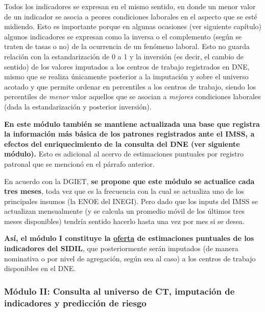 \documentclass[
]{article}
\begin{document}
\begin{rmdcomment}
Todos los indicadores se expresan en el mismo sentido, en donde un menor
valor de un indicador se asocia a peores condiciones laborales en el
aspecto que se esté midiendo. Esto es importante porque en algunas
ocasiones (ver siguiente capítulo) algunos indicadores se expresan como
la inversa o el complemento (según se traten de tasas o no) de la
ocurrencia de un fenómeno laboral. Esto no guarda relación con la
estandarización de 0 a 1 y la inversión (es decir, el cambio de sentido)
de los valores imputados a los centros de trabajo registrados en DNE,
mismo que se realiza únicamente posterior a la imputación y sobre el
universo acotado y que permite ordenar en percentiles a los centros de
trabajo, siendo los percentiles de \emph{menor} valor aquellos que se
asocian a \emph{mejores} condiciones laborales (dada la estandarización
y posterior inversión).
\end{rmdcomment}

\textbf{En este módulo también se mantiene actualizada una base que registra la información más básica de los patrones registrados ante el IMSS, a efectos del enriquecimiento de la consulta del DNE (ver siguiente módulo).} Esto es adicional al acervo de estimaciones puntuales por registro patronal que se mencionó en el párrafo anterior.

En acuerdo con la DGIET, \textbf{se propone que este módulo se actualice cada tres meses}, toda vez que es la frecuencia con la cual se actualiza uno de los principales insumos (la ENOE del INEGI). Pero dado que los inputs del IMSS se actualizan mensualmente (y se calcula un promedio móvil de los últimos tres meses disponibles) tendría sentido hacerlo hasta una vez por mes si se desea.

\textbf{Así, el módulo I constituye la \ul{oferta} de estimaciones puntuales de los indicadores del SIDIL}, que posteriormente serán imputados (de manera nominativa o por nivel de agregación, según sea al caso) a los centros de trabajo disponibles en el DNE.

\hypertarget{moduloIIexplicaciongeneral}{%
\subsubsection*{Módulo II: Consulta al universo de CT, imputación de indicadores y predicción de riesgo}\label{moduloIIexplicaciongeneral}}
\end{document}
